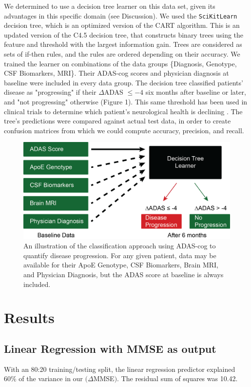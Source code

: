 \documentclass{article}
\begin{document}
We determined to use a decision tree learner on this data set, given its advantages in this specific domain (see Discussion). We used the {\tt SciKitLearn} decision tree, which is an optimized version of the CART algorithm. This is an updated version of the C4.5 decision tree, that constructs binary trees using the feature and threshold with the largest information gain. Trees are considered as sets of if-then rules, and the rules are ordered depending on their accuracy. We trained the learner on combinations of the data groups \{Diagnosis, Genotype, CSF Biomarkers, MRI\}. Their ADAS-cog scores and physician diagnosis at baseline were included in every data group. The decision tree classified patients' disease as "progressing" if their $\Delta$ADAS $\leq-4$ six months after baseline or later, and "not progressing" otherwise (Figure 1). This same threshold has been used in clinical trials to determine which patient's neurological health is declining \cite{rockwood07}. 
The tree's predictions were compared against actual test data, in order to create confusion matrices from which we could compute accuracy, precision, and recall.
\begin{figure}

    \includegraphics[width=.5\textwidth]{ADNIFlowchart.png}
    \caption{An illustration of the classification approach using ADAS-cog to quantify disease progression. For any given patient, data may be available for their ApoE Genotype, CSF Biomarkers, Brain MRI, and Physician Diagnosis, but the ADAS score at baseline is always included.}
\end{figure}


\section{Results}


\subsection{Linear Regression with MMSE as output}
With an 80:20 training/testing split, the linear regression predictor explained 60\% of the variance in our $(\Delta$MMSE$)$. The residual sum of squares was 10.42.
\end{document}
